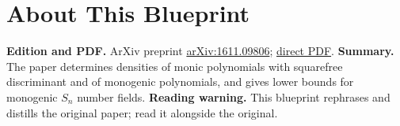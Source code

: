 

\chapter*{About This Blueprint}
\label{squarefree-values-polynomial-discriminants-about}

\textbf{Edition and PDF.} ArXiv preprint \href{https://arxiv.org/abs/1611.09806}{arXiv:1611.09806};
\href{https://arxiv.org/pdf/1611.09806}{direct PDF}.
\textbf{Summary.} The paper determines densities of monic polynomials with squarefree discriminant and of monogenic
polynomials, and gives lower bounds for monogenic $S_n$ number fields.
\textbf{Reading warning.} This blueprint rephrases and distills the original paper; read it alongside the original.










